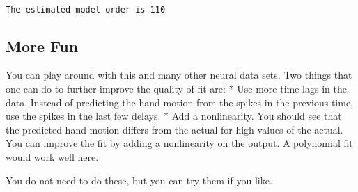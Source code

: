 \documentclass[11pt]{article}
\begin{document}
    \begin{center}
    \end{center}
    { \hspace*{\fill} \\}
    
    \begin{Verbatim}[commandchars=\\\{\}]
The estimated model order is 110

    \end{Verbatim}

    \hypertarget{more-fun}{%
\subsection{More Fun}\label{more-fun}}

You can play around with this and many other neural data sets. Two
things that one can do to further improve the quality of fit are: * Use
more time lags in the data. Instead of predicting the hand motion from
the spikes in the previous time, use the spikes in the last few delays.
* Add a nonlinearity. You should see that the predicted hand motion
differs from the actual for high values of the actual. You can improve
the fit by adding a nonlinearity on the output. A polynomial fit would
work well here.

You do not need to do these, but you can try them if you like.


    
    
    
    
\end{document}
